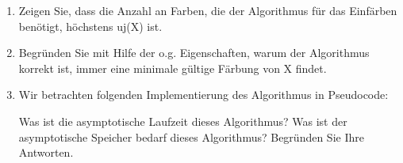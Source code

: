 \documentclass{lehramt-informatik-aufgabe}
\begin{document}
\begin{enumerate}

\item Zeigen Sie, dass die Anzahl an Farben, die der Algorithmus für das
Einfärben benötigt, höchstens uj(X) ist.


\item Begründen Sie mit Hilfe der o.g. Eigenschaften, warum der
Algorithmus korrekt ist, \dh immer eine minimale gültige Färbung von X
findet.


\item Wir betrachten folgenden Implementierung des Algorithmus in
Pseudocode:

















Was ist die asymptotische Laufzeit dieses Algorithmus? Was ist der
asymptotische Speicher bedarf dieses Algorithmus? Begründen Sie Ihre
Antworten.
\end{enumerate}
\end{document}
